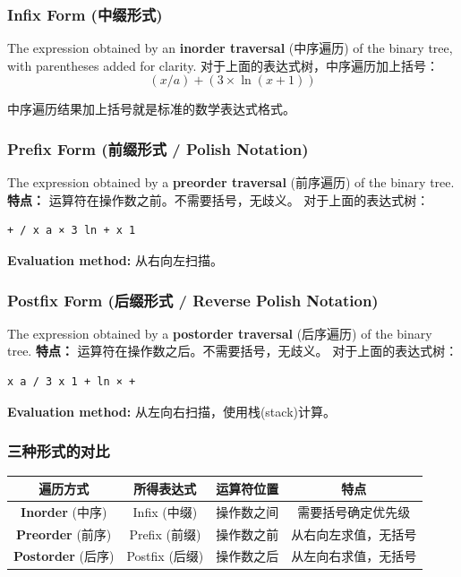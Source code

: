 \documentclass[10pt,a4paper,openany]{ctexbook}
\theoremstyle{definition}
\theoremstyle{remark}
\renewenvironment{quote}
  {\list{}{\leftmargin=1em\rightmargin=0pt\topsep=0.5pt\partopsep=0pt}\item[]}
  {\endlist}
\begin{document}
\subsubsection{Infix Form (中缀形式)}

The expression obtained by an \textbf{inorder traversal} (中序遍历) of the binary tree, with parentheses added for clarity.
对于上面的表达式树，中序遍历加上括号：
\[
(x / a) + (3 \times \ln(x + 1))
\]

\begin{quote}
中序遍历结果加上括号就是标准的数学表达式格式。

\end{quote}
\vspace{-2pt}

\subsubsection{Prefix Form (前缀形式 / Polish Notation)}

The expression obtained by a \textbf{preorder traversal} (前序遍历) of the binary tree.
\textbf{特点：} 运算符在操作数之前。不需要括号，无歧义。
对于上面的表达式树：
{\footnotesize\begin{verbatim}
+ / x a × 3 ln + x 1
\end{verbatim}}

\textbf{Evaluation method:} 从右向左扫描。
\vspace{-2pt}

\subsubsection{Postfix Form (后缀形式 / Reverse Polish Notation)}

The expression obtained by a \textbf{postorder traversal} (后序遍历) of the binary tree.
\textbf{特点：} 运算符在操作数之后。不需要括号，无歧义。
对于上面的表达式树：
{\footnotesize\begin{verbatim}
x a / 3 x 1 + ln × +
\end{verbatim}}

\textbf{Evaluation method:} 从左向右扫描，使用栈(stack)计算。
\vspace{-2pt}

\subsubsection{三种形式的对比}

\begin{center}
\begin{tabular}{cccc}
\hline
遍历方式 & 所得表达式 & 运算符位置 & 特点 \\ \hline
\textbf{Inorder} (中序) & Infix (中缀) & 操作数之间 & 需要括号确定优先级 \\
\textbf{Preorder} (前序) & Prefix (前缀) & 操作数之前 & 从右向左求值，无括号 \\
\textbf{Postorder} (后序) & Postfix (后缀) & 操作数之后 & 从左向右求值，无括号 \\
\hline
\end{tabular}

\end{center}
\end{document}
